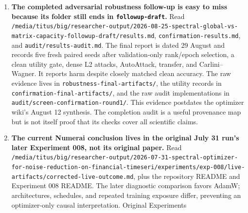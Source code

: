 \documentclass[
  british,
  10pt,
  a4paper,
]{article}
\providecommand{\tightlist}{%
  \setlength{\itemsep}{0pt}\setlength{\parskip}{0pt}}
\begin{document}
\begin{enumerate}
\def\labelenumi{\arabic{enumi}.}
\tightlist
\item
  \textbf{The completed adversarial robustness follow-up is easy to miss
  because its folder still ends in
  \texttt{followup-\allowbreak{}draft}.} Read
  \texttt{/\allowbreak{}media/\allowbreak{}titus/\allowbreak{}big/\allowbreak{}researcher-\allowbreak{}output/\allowbreak{}2026-\allowbreak{}08-\allowbreak{}25-\allowbreak{}spectral-\allowbreak{}global-\allowbreak{}vs-\allowbreak{}matrix-\allowbreak{}capacity-\allowbreak{}followup-\allowbreak{}draft/\allowbreak{}results.\allowbreak{}md},
  \texttt{confirmation\allowbreak{}-\allowbreak{}results.\allowbreak{}md},
  and
  \texttt{audit/\allowbreak{}results-\allowbreak{}audit.\allowbreak{}md}.
  The final report is dated 29 August and records five fresh paired
  seeds after validation-\allowbreak{}only rank/epoch selection, a clean
  utility gate, dense L2 attacks, AutoAttack,\allowbreak{} transfer, and
  Carlini–Wagn\allowbreak{}er.\allowbreak{} It reports harm despite
  closely matched clean accuracy. The raw evidence lives in
  \texttt{robustness-\allowbreak{}final-\allowbreak{}artifacts/\allowbreak{}},
  the utility records in
  \texttt{confirmation\allowbreak{}-\allowbreak{}final-\allowbreak{}artifacts/\allowbreak{}},
  and the raw audit implementations in
  \texttt{audit/\allowbreak{}screen-\allowbreak{}confirmation\allowbreak{}-\allowbreak{}round1/\allowbreak{}}.
  This evidence postdates the optimizer wiki's August 12 synthesis. The
  completion audit is a useful provenance map but is not itself proof
  that its checks cover all scientific claims.
\item
  \textbf{The current Numerai conclusion lives in the original July 31
  run's later Experiment 008, not its original paper.} Read
  \texttt{/\allowbreak{}media/\allowbreak{}titus/\allowbreak{}big/\allowbreak{}researcher-\allowbreak{}output/\allowbreak{}2026-\allowbreak{}07-\allowbreak{}31-\allowbreak{}spectral-\allowbreak{}optimizer-\allowbreak{}for-\allowbreak{}noise-\allowbreak{}reduction-\allowbreak{}on-\allowbreak{}financial-\allowbreak{}timeseri/\allowbreak{}experiments/\allowbreak{}exp-\allowbreak{}008/\allowbreak{}live-\allowbreak{}artifacts/\allowbreak{}corrected-\allowbreak{}live-\allowbreak{}outcome.\allowbreak{}md},
  plus the repository README and Experiment 008 README. The later
  diagnostic comparison favors AdamW;
  architecture\allowbreak{}s,\allowbreak{} schedules, and repeated
  training exposure differ, preventing an optimizer-\allowbreak{}only
  causal interpretati\allowbreak{}on.\allowbreak{} Original Experiments

\end{enumerate}
\end{document}
